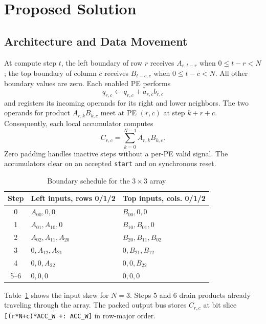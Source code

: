 \documentclass[conference]{IEEEtran}
\begin{document}
\section{Proposed Solution}
\subsection{Architecture and Data Movement}
At compute step $t$, the left boundary of row $r$ receives $A_{r,t-r}$ when $0\leq t-r<N$; the top boundary of column $c$ receives $B_{t-c,c}$ when $0\leq t-c<N$. All other boundary values are zero. Each enabled PE performs
\begin{equation}
q_{r,c}\leftarrow q_{r,c}+a_{r,c}b_{r,c}
\end{equation}
and registers its incoming operands for its right and lower neighbors. The two operands for product $A_{r,k}B_{k,c}$ meet at PE $(r,c)$ at step $k+r+c$. Consequently, each local accumulator computes
\begin{equation}
C_{r,c}=\sum_{k=0}^{N-1} A_{r,k}B_{k,c}.
\end{equation}
Zero padding handles inactive steps without a per-PE valid signal. The accumulators clear on an accepted \texttt{start} and on synchronous reset.

\begin{table}[t]
\caption{Boundary schedule for the $3\times3$ array}
\label{tab:schedule}
\centering
\footnotesize
\begin{tabular}{@{}c p{} p{}@{}}
\toprule
Step & Left inputs, rows 0/1/2 & Top inputs, cols. 0/1/2 \\
\midrule
0 & $A_{00},0,0$ & $B_{00},0,0$ \\
1 & $A_{01},A_{10},0$ & $B_{10},B_{01},0$ \\
2 & $A_{02},A_{11},A_{20}$ & $B_{20},B_{11},B_{02}$ \\
3 & $0,A_{12},A_{21}$ & $0,B_{21},B_{12}$ \\
4 & $0,0,A_{22}$ & $0,0,B_{22}$ \\
5--6 & $0,0,0$ & $0,0,0$ \\
\bottomrule
\end{tabular}
\end{table}

Table~\ref{tab:schedule} shows the input skew for $N=3$. Steps 5 and 6 drain products already traveling through the array. The packed output bus stores $C_{r,c}$ at bit slice \texttt{[(r*N+c)*ACC\_W +: ACC\_W]} in row-major order.
\end{document}
